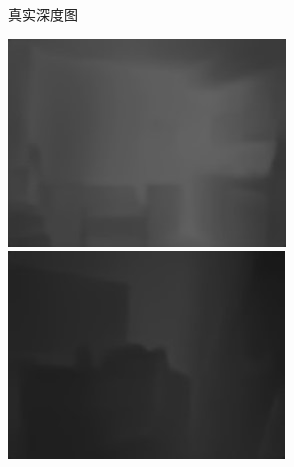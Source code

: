 \begin{figure}[htb]
\begin{subfigure}{0.24\linewidth}
\begin{minipage}[b]{1\linewidth}
  \end{minipage}
  \caption{真实深度图}
  \end{subfigure}
  \begin{subfigure}{0.24\linewidth}
  \begin{minipage}[b]{1\linewidth}
  \includegraphics[width=1\linewidth]{figure/Pixel_cla_nyu/1res.jpg}\vspace{4pt}
  \includegraphics[width=1\linewidth]{figure/Pixel_cla_nyu/2res.jpg}\vspace{4pt}

\end{minipage}
\end{subfigure}
\end{figure}
